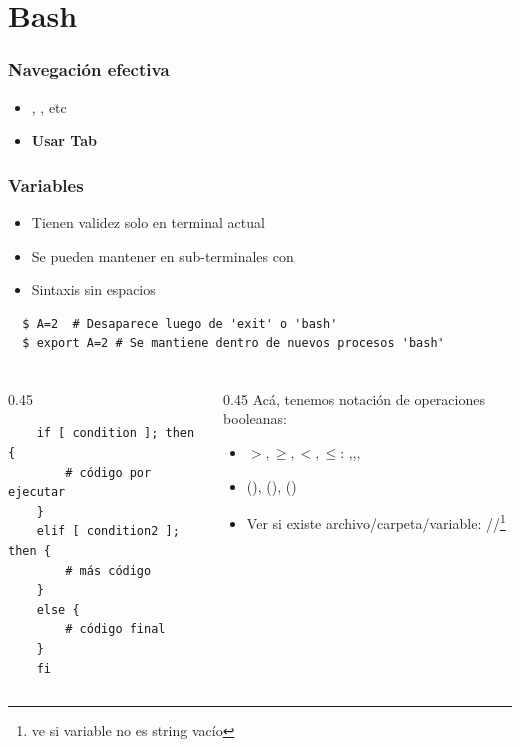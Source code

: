 \documentclass[14pt,aspectratio=169,xcolor=dvipsnames]{beamer}
\begin{document}
\section{Bash}
\begin{frame}\frametitle{Navegación efectiva}
    \begin{itemize}
        \item {}, , etc
        \item \textbf{Usar Tab}
    \end{itemize}

\end{frame}
\begin{frame}[fragile]\frametitle{Variables}
    \begin{itemize}
        \item Tienen validez solo en terminal actual
        \item Se pueden mantener en sub-terminales con 
        \item Sintaxis sin espacios
    \end{itemize}
    
    \begin{verbatim}
  $ A=2  # Desaparece luego de 'exit' o 'bash'
  $ export A=2 # Se mantiene dentro de nuevos procesos 'bash'
    \end{verbatim}
\end{frame}
\begin{frame}[fragile]\frametitle{}
    \begin{small}
    \begin{columns}
        \begin{column}{0.45\textwidth}
            \begin{verbatim}
    if [ condition ]; then {
        # código por ejecutar
    }
    elif [ condition2 ]; then {
        # más código
    }
    else {
        # código final
    }
    fi
            \end{verbatim}
        \end{column}
        \begin{column}{0.45\textwidth}
            Acá, tenemos notación de operaciones booleanas:
            \begin{itemize}
                \item $>,\geq,<,\leq$: ,,,
                \item {} (\code{!}),  (),  ()
                \item Ver si existe archivo/carpeta/variable: //\footnote{ ve si variable no es string vacío}
            \end{itemize}
        \end{column}
    \end{columns}
    \end{small}
\end{frame}
\end{document}
